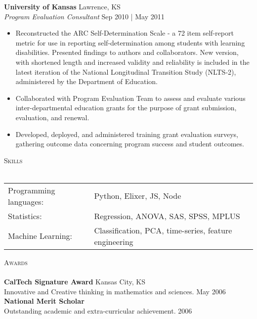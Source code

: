 \documentclass[a4paper]{article}
\newcommand{\lineunder} {
    \vspace*{-8pt} \\
    \hspace*{-18pt} \hrulefill \\
}
\newcommand{\header} [1] {
    {\hspace*{-18pt}\vspace*{6pt} \textsc{#1}}
    \vspace*{-6pt} \lineunder
}
\begin{document}
\textbf{University of Kansas} \hfill Lawrence, KS\\
\textit{Program Evaluation Consultant} \hfill Sep 2010 | May 2011\\
\vspace{-1mm}
\begin{itemize} \itemsep 1pt
	\item Reconstructed the ARC Self-Determination Scale - a 72 item self-report metric for use in reporting self-determination among students with learning disabilities. Presented findings to authors and collaborators. New version, with shortened length and increased validity and reliability is included in the latest iteration of the National Longitudinal Transition Study (NLTS-2), administered by the Department of Education.
	\item Collaborated with Program Evaluation Team to assess and evaluate various inter-departmental education grants for the purpose of grant submission, evaluation, and renewal.
	\item Developed, deployed, and administered training grant evaluation surveys, gathering outcome data concerning program success and student outcomes.
\end{itemize}

\header{Skills}
\begin{tabular}{ l l }
	Programming languages: & Python, Elixer, JS, Node                              \\
	Statistics:            & Regression, ANOVA, SAS, SPSS, MPLUS                   \\
	Machine Learning:      & Classification, PCA, time-series, feature engineering \\
\end{tabular}

\vspace*{2mm}

        

\vspace*{2mm}

\header{Awards}
\textbf{CalTech Signature Award} \hfill Kansas City, KS\\
Innovative and Creative thinking in mathematics and sciences. \hfill May 2006\\
\vspace*{2mm}
\textbf{National Merit Scholar}\\
Outstanding academic and extra-curricular achievement. \hfill 2006\\
\vspace*{2mm}

\ 
\end{document}
